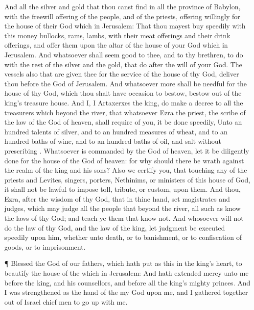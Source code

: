 {And
all the
silver and
gold that thou canst
find in
all the
province of
Babylon,
with the freewill
offering of the
people, and of the
priests, offering
willingly for the
house of their
God which
{} in
Jerusalem:
That thou mayest
buy
speedily with
this
money
bullocks,
rams,
lambs, with their meat
offerings and their drink
offerings, and
offer
them
upon the
altar of the
house of your
God which
{} in
Jerusalem.
And
whatsoever shall seem
good to thee, and
to thy
brethren, to
do with the
rest of the
silver and the
gold, that
do after the
will of your
God.
The
vessels also that are
given thee for the
service of the
house of thy
God,
{}
deliver thou
before the
God of
Jerusalem.
And whatsoever
more shall be
needful for the
house of thy
God, which thou shalt have
occasion to
bestow,
bestow
{} out
of the
king’s
treasure
house.
And
I,
{}
I
Artaxerxes the
king, do
make a
decree to
all the
treasurers which
{}
beyond the
river, that whatsoever
Ezra the
priest, the
scribe of the
law of the
God of
heaven, shall
require of you, it be
done
speedily,
Unto an
hundred
talents of
silver, and to an
hundred
measures of
wheat, and to an
hundred
baths of
wine, and to an
hundred
baths of
oil, and
salt
without
prescribing
{}.
Whatsoever is commanded
by the
God of
heaven, let it be
diligently
done for the
house of the
God of
heaven:
for
why should there
be
wrath
against the
realm of the
king and his
sons?
Also we
certify you, that touching
any of the
priests and
Levites,
singers,
porters,
Nethinims, or
ministers of
this
house of
God, it shall
not be
lawful to
impose
toll,
tribute, or
custom,
upon them.
And
thou,
Ezra, after the
wisdom of thy
God, that
{} in thine
hand,
set
magistrates and
judges, which may
judge
all the
people that
{}
beyond the
river,
all such as
know the
laws of thy
God; and
teach ye them that
know
{}
not.
And
whosoever will
not
do the
law of thy
God, and the
law of the
king, let
judgment
be
executed
speedily upon
him,
whether
{} unto
death,
or to
banishment,
or to
confiscation of
goods, or to
imprisonment.
\par }{\PP {}¶
Blessed
{} the
{}
God of our
fathers, which hath
put
{} as this in the
king’s
heart, to
beautify the
house of the
{} which
{} in
Jerusalem:
And hath
extended
mercy unto me
before the
king, and his
counsellors, and before all the
king’s
mighty
princes. And I was
strengthened as the
hand of the
{} my
God
{} upon me, and I gathered
together out of
Israel chief
men to go
up with me.

}
